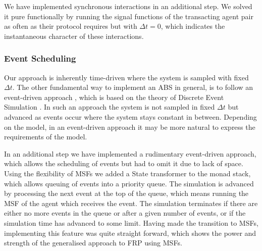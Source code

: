 We have implemented synchronous interactions in an additional step. We solved it pure functionally by running the signal functions of the transacting agent pair as often as their protocol requires but with $\Delta t=0$, which indicates the instantaneous character of these interactions.

\subsubsection{Event Scheduling}
Our approach is inherently time-driven where the system is sampled with fixed $\Delta t$. The other fundamental way to implement an ABS in general, is to follow an event-driven approach \cite{meyer_event-driven_2014}, which is based on the theory of Discrete Event Simulation \cite{zeigler_theory_2000}. In such an approach the system is not sampled in fixed $\Delta t$ but advanced as events occur where the system stays constant in between. Depending on the model, in an event-driven approach it may be more natural to express the requirements of the model.

In an additional step we have implemented a rudimentary event-driven approach, which allows the scheduling of events but had to omit it due to lack of space. Using the flexibility of MSFs we added a State transformer to the monad stack, which allows queuing of events into a priority queue. The simulation is advanced by processing the next event at the top of the queue, which means running the MSF of the agent which receives the event. The simulation terminates if there are either no more events in the queue or after a given number of events, or if the simulation time has advanced to some limit. Having made the transition to MSFs, implementing this feature was quite straight forward, which shows the power and strength of the generalised approach to FRP using MSFs.


